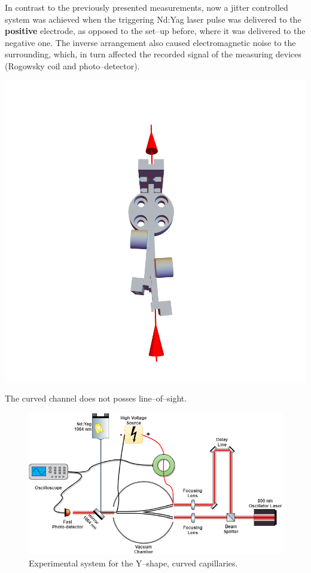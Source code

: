 \documentclass[../main.tex]{subfiles}
\begin{document}
In contrast to the previously presented measurements, now a jitter controlled system was achieved when the triggering Nd:Yag laser pulse was delivered to the \textbf{positive} electrode, as opposed to the set--up before, where it was delivered to the negative one. The inverse arrangement also caused electromagnetic noise to the surrounding, which, in turn affected the recorded signal of the measuring devices (Rogowsky coil and photo--detector).
\begin{marginfigure}
\includegraphics[width=\marginparwidth]{figures/Curved capillaries/line-of-sight.png}
\caption{The curved channel does not posses line--of--sight.}
\label{fig:lineofsight}
\end{marginfigure}

\begin{figure}
    \centering
    \includegraphics[width=\textwidth]{figures/Curved capillaries/system double capillary.png}
    \caption{Experimental system for the Y--shape, curved capillaries.}
    \label{fig:twostage_system}
\end{figure}
\end{document}
